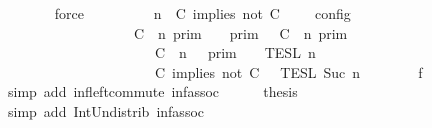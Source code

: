 \begin{isabellebody}
\ \ \ \ \ \ \isamarkupfalse%
\ force\isanewline
\ \ \ \ \isamarkupfalse%
\ \isamarkupfalse%
\ {\isacartoucheopen}{\isasymlbrakk}\ {\isasymGamma}{\isacharcomma}\ n\ {\isasymTurnstile}\ {\isacharparenleft}{\isacharparenleft}C\ implies\ not\ C\ {\isacharhash}\ {\isasymPsi}{\isacharparenright}\ {\isasymtriangleright}\ {\isasymPhi}\ {\isasymrbrakk}\isactrlsub c\isactrlsub o\isactrlsub n\isactrlsub f\isactrlsub i\isactrlsub g\isanewline
\ \ \ \ \ \ \ \ \ \ \ \ \ \ \ \ \ {\isacharequal}\ {\isacharparenleft}{\isasymlbrakk}\ C\ {\isasymnot}{\isasymUp}\ n\ {\isasymrbrakk}\isactrlsub p\isactrlsub r\isactrlsub i\isactrlsub m\ {\isasyminter}\ {\isasymlbrakk}{\isasymlbrakk}\ {\isasymGamma}\ {\isasymrbrakk}{\isasymrbrakk}\isactrlsub p\isactrlsub r\isactrlsub i\isactrlsub m\ {\isasymunion}\ {\isasymlbrakk}\ C\ {\isasymUp}\ n\ {\isasymrbrakk}\isactrlsub p\isactrlsub r\isactrlsub i\isactrlsub m\isanewline
\ \ \ \ \ \ \ \ \ \ \ \ \ \ \ \ \ \ \ \ {\isasyminter}\ {\isasymlbrakk}{\isasymlbrakk}\ {\isacharparenleft}C\ {\isasymnot}{\isasymUp}\ n{\isacharparenright}\ {\isacharhash}\ {\isasymGamma}\ {\isasymrbrakk}{\isasymrbrakk}\isactrlsub p\isactrlsub r\isactrlsub i\isactrlsub m{\isacharparenright}\ {\isasyminter}\ {\isacharparenleft}{\isasymlbrakk}{\isasymlbrakk}\ {\isasymPsi}\ {\isasymrbrakk}{\isasymrbrakk}\isactrlsub T\isactrlsub E\isactrlsub S\isactrlsub L\isactrlbsup {\isasymge}\ n\isactrlesup \isanewline
\ \ \ \ \ \ \ \ \ \ \ \ \ \ \ \ \ \ \ \ {\isasyminter}\ {\isasymlbrakk}{\isasymlbrakk}\ {\isacharparenleft}C\ implies\ not\ C\ {\isacharhash}\ {\isasymPhi}\ {\isasymrbrakk}{\isasymrbrakk}\isactrlsub T\isactrlsub E\isactrlsub S\isactrlsub L\isactrlbsup {\isasymge}\ Suc\ n\isactrlesup {\isacharparenright}{\isacartoucheclose}\isanewline
\ \ \ \ \ \ \isamarkupfalse%
\ f{}\ \isamarkupfalse%
\ {\isacharparenleft}simp\ add{\isacharcolon}\ inf{\isacharunderscore}left{\isacharunderscore}commute\ inf{\isacharunderscore}assoc{\isacharparenright}\isanewline
\ \ \ \ \isamarkupfalse%
\ {\isacharquery}thesis\ \isamarkupfalse%
\ {\isacharparenleft}simp\ add{\isacharcolon}\ Int{\isacharunderscore}Un{\isacharunderscore}distrib{}\ inf{\isacharunderscore}assoc{\isacharparenright}\isanewline
\ \ \isamarkupfalse%
\isanewline

\end{isabellebody}

